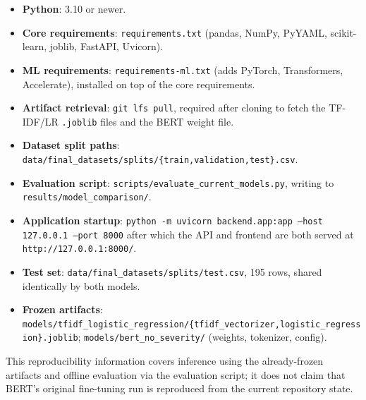 \begin{itemize}[nosep]
  \item \textbf{Python}: 3.10 or newer.
  \item \textbf{Core requirements}: \texttt{requirements.txt} (pandas, NumPy, PyYAML, scikit-learn, joblib, FastAPI, Uvicorn).
  \item \textbf{ML requirements}: \texttt{requirements-ml.txt} (adds PyTorch, Transformers, Accelerate), installed on top of the core requirements.
  \item \textbf{Artifact retrieval}: \texttt{git lfs pull}, required after cloning to fetch the TF-IDF/LR \texttt{.joblib} files and the BERT weight file.
  \item \textbf{Dataset split paths}: \texttt{data/\pbrk final\_\pbrk datasets/\pbrk splits/\pbrk \{train,validation,test\}.csv}.
  \item \textbf{Evaluation script}: \texttt{scripts/\pbrk evaluate\_\pbrk current\_\pbrk models.py}, writing to \texttt{results/\pbrk model\_\pbrk comparison/\pbrk }.
  \item \textbf{Application startup}:\newline
  \texttt{python -m uvicorn backend.app:app --host 127.0.0.1 --port 8000}\newline
  after which the API and frontend are both served at \texttt{http://127.0.0.1:8000/}.
  \item \textbf{Test set}: \texttt{data/final\_\pbrk datasets/splits/test.csv}, 195 rows, shared identically by both models.
  \item \textbf{Frozen artifacts}:\newline
  \texttt{models/tfidf\_\pbrk logistic\_\pbrk regression/\{tfidf\_\pbrk vectorizer,\newline logistic\_\pbrk regression\}.joblib};\newline
  \texttt{models/bert\_\pbrk no\_\pbrk severity/} (weights, tokenizer, config).
\end{itemize}

This reproducibility information covers inference using the already-frozen artifacts and offline evaluation via the evaluation script; it does not claim that BERT's original fine-tuning run is reproduced from the current repository state.

